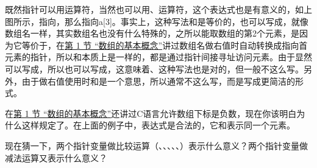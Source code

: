 既然指针可以用\BookCode{+\BookSplit{}+\BookSplit{}}运算符，当然也可以用\BookCode{+\BookSplit{}}、\BookCode{-\BookSplit{}}运算符，这个表达式也是有意义的，如上图所示，指向，那么指向a[3]。事实上，这种写法和是等价的，也可以写成，就像数组名一样，其实数组名也没有什么特殊的，之所以能取数组的第2个元素，是因为它等价于，在\hyperlink{db.ch08s01.id2733213}{第 1 节 “数组的基本概念”}讲过数组名做右值时自动转换成指向首元素的指针，所以和本质上是一样的，都是通过指针间接寻址访问元素。由于显然可以写成，所以也可以写成，这意味着\BookCode{2[\BookSplit{}a]\BookSplit{}}、\BookCode{2[\BookSplit{}pa]\BookSplit{}}这种写法也是对的，但一般不这么写。另外，由于做右值使用时和是一个意思，所以通常不这么写，而是写成更简洁的形式。



在\hyperlink{db.ch08s01.id2733213}{第 1 节 “数组的基本概念”}还讲过C语言允许数组下标是负数，现在你该明白为什么这样规定了。在上面的例子中，表达式是合法的，它和表示同一个元素。



现在猜一下，两个指针变量做比较运算（\BookCode{\textgreater{}}、\BookCode{\textgreater{}=\BookSplit{}}、\BookCode{\textless{}}、\BookCode{\textless{}=\BookSplit{}}、\BookCode{=\BookSplit{}=\BookSplit{}}、\BookCode{!=\BookSplit{}}）表示什么意义？两个指针变量做减法运算又表示什么意义？



